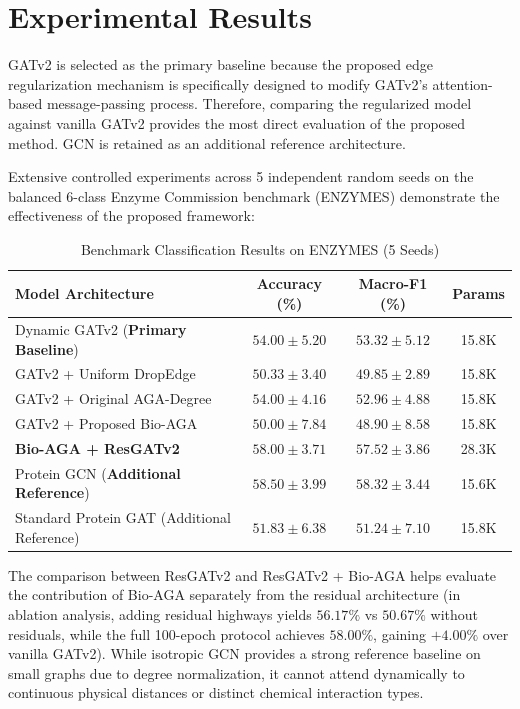 \documentclass[10pt,journal,compsoc]{IEEEtran}
\begin{document}
\section{Experimental Results}
GATv2 is selected as the primary baseline because the proposed edge regularization mechanism is specifically designed to modify GATv2's attention-based message-passing process. Therefore, comparing the regularized model against vanilla GATv2 provides the most direct evaluation of the proposed method. GCN is retained as an additional reference architecture.

Extensive controlled experiments across 5 independent random seeds on the balanced 6-class Enzyme Commission benchmark (ENZYMES) demonstrate the effectiveness of the proposed framework:

\begin{table}[h]
\centering
\caption{Benchmark Classification Results on ENZYMES (5 Seeds)}
\begin{tabular}{lccc}
\toprule
\textbf{Model Architecture} & \textbf{Accuracy (\%)} & \textbf{Macro-F1 (\%)} & \textbf{Params} \\
\midrule
Dynamic GATv2 (\textbf{Primary Baseline}) & $54.00 \pm 5.20$ & $53.32 \pm 5.12$ & 15.8K \\
GATv2 + Uniform DropEdge & $50.33 \pm 3.40$ & $49.85 \pm 2.89$ & 15.8K \\
GATv2 + Original AGA-Degree & $54.00 \pm 4.16$ & $52.96 \pm 4.88$ & 15.8K \\
GATv2 + Proposed Bio-AGA & $50.00 \pm 7.84$ & $48.90 \pm 8.58$ & 15.8K \\
\textbf{Bio-AGA + ResGATv2} & $\mathbf{58.00 \pm 3.71}$ & $\mathbf{57.52 \pm 3.86}$ & 28.3K \\
\midrule
Protein GCN (\textbf{Additional Reference}) & $58.50 \pm 3.99$ & $58.32 \pm 3.44$ & 15.6K \\
Standard Protein GAT (Additional Reference) & $51.83 \pm 6.38$ & $51.24 \pm 7.10$ & 15.8K \\
\bottomrule
\end{tabular}
\end{table}

The comparison between ResGATv2 and ResGATv2 + Bio-AGA helps evaluate the contribution of Bio-AGA separately from the residual architecture (in ablation analysis, adding residual highways yields $56.17\%$ vs $50.67\%$ without residuals, while the full 100-epoch protocol achieves $58.00\%$, gaining $+4.00\%$ over vanilla GATv2). While isotropic GCN provides a strong reference baseline on small graphs due to degree normalization, it cannot attend dynamically to continuous physical distances or distinct chemical interaction types.
\end{document}
